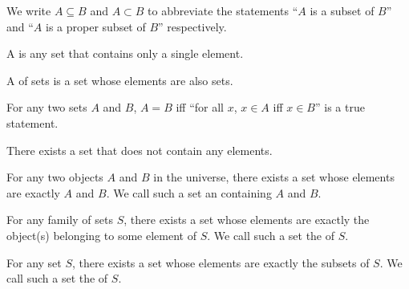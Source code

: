 \begin{notation}
    We write \( A \subseteq B \) and \( A \subset B \) to abbreviate the statements ``\( A \) is a subset of \( B \)'' and
    ``\( A \) is a proper subset of \( B \)'' respectively.
\end{notation}

\begin{dfn}[Singleton]
     \label{dfn:metatheory-singleton}
    A  is any set that contains only a single element.
\end{dfn}

\begin{dfn}
     \label{dfn:metatheory-family-of-sets}
    A  of sets is a set whose elements are also sets.
\end{dfn} 

\begin{meta-axiom}
     \label{meta-axiom:extensionality}
    For any two sets \( A \) and \( B \), \( A = B \) iff
    ``for all \( x \), \( x \in A \) iff \( x \in B \)'' is a true statement.
\end{meta-axiom}

\begin{meta-axiom}
     \label{meta-axiom:existence-of-empty-set}
    There exists a set that does not contain any elements.
\end{meta-axiom}

\begin{meta-axiom}
     \label{meta-axiom:pairing}
    For any two objects \( A \) and \( B \) in the universe, there exists a set whose elements are exactly \( A \) and \( B \).
    We call such a set an  containing \( A \) and \( B \).
\end{meta-axiom}

\begin{meta-axiom}
     \label{meta-axiom:union}
    For any family of sets \( S \), there exists a set whose elements are exactly the object(s) belonging to some element of \( S \).
    We call such a set the  of \( S \).
\end{meta-axiom}

\begin{meta-axiom}
     \label{meta-axiom:power-set}
    For any set \( S \), there exists a set whose elements are exactly the subsets of \( S \).
    We call such a set the  of \( S \).
\end{meta-axiom}

